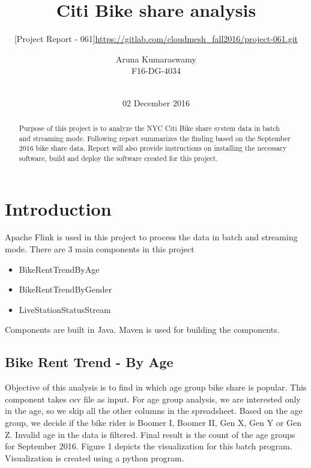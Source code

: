 \documentclass{sig-alternate-05-2015}
\begin{document}
\title{Citi Bike share analysis}  
\subtitle{[Project Report - 061]}
\subtitle{\url{https://gitlab.com/cloudmesh_fall2016/project-061.git}}


\author{
\alignauthor
Aruna Kumaraswamy\\
F16-DG-4034\\
       \\
}
\date{02 December 2016}

\maketitle

\begin{abstract}
    Purpose of this project is to analyze the NYC Citi Bike share system data in batch and streaming mode. Following report summarizes the finding based on the September 2016 bike share data. Report will also provide instructions on installing the necessary software, build and deploy the software created for this project.
\end{abstract}


\section{Introduction}
Apache Flink is used in this project to process the data in batch and streaming mode. There are 3 main components in this project
\begin{itemize}
    \item BikeRentTrendByAge
    \item BikeRentTrendByGender
    \item LiveStationStatusStream
\end{itemize}
Components are built in Java. Maven is used for building the components.
\subsection {Bike Rent Trend - By Age}
Objective of this analysis is to find in which age group bike share is popular. This component takes csv file as input. For age group analysis, we are interested only in the age, so we skip all the other columns in the spreadsheet. Based on the age group, we decide if the bike rider is Boomer I, Boomer II, Gen X, Gen Y or Gen Z. Invalid age in the data is filtered. Final result is the count of the age groups for September 2016. Figure 1 depicts the visualization for this batch program. Visualization is created using a python program.
\end{document}
